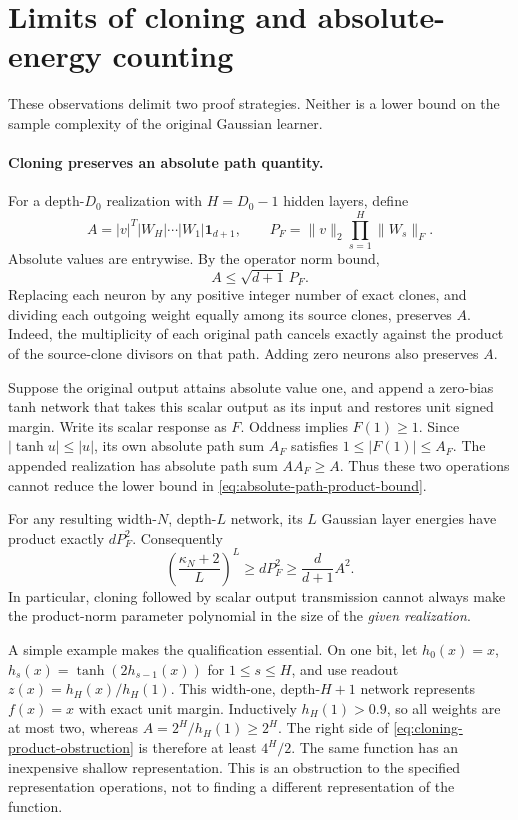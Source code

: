 \section{Limits of cloning and absolute-energy counting}
\label{sec:representation-limits}

These observations delimit two proof strategies. Neither is a lower bound
on the sample complexity of the original Gaussian learner.

\paragraph{Cloning preserves an absolute path quantity.}
For a depth-$D_0$ realization with $H=D_0-1$ hidden layers, define
\[
 A=|v|^T|W_H|\cdots|W_1|\mathbf1_{d+1},\qquad
 P_F=\|v\|_2\prod_{s=1}^H\|W_s\|_F.
\]
Absolute values are entrywise. By the operator norm bound,
\begin{equation}\label{eq:absolute-path-product-bound}
 A\le\sqrt{d+1}\,P_F.
\end{equation}
Replacing each neuron by any positive integer number of exact clones,
and dividing each outgoing weight equally among its source clones,
preserves $A$. Indeed, the multiplicity of each original path cancels
exactly against the product of the source-clone divisors on that path.
Adding zero neurons also preserves $A$.

Suppose the original output attains absolute value one, and append a
zero-bias tanh network that takes this scalar output as its input and
restores unit signed margin. Write its scalar response as $F$. Oddness
implies $F(1)\ge1$. Since $|\tanh u|\le|u|$, its own absolute path sum
$A_F$ satisfies $1\le|F(1)|\le A_F$. The appended realization has
absolute path sum $AA_F\ge A$. Thus these two operations cannot reduce
the lower bound in \eqref{eq:absolute-path-product-bound}.

For any resulting width-$N$, depth-$L$ network, its $L$ Gaussian layer
energies have product exactly $dP_F^2$. Consequently
\begin{equation}\label{eq:cloning-product-obstruction}
 \left(\frac{\kappa_N+2}{L}\right)^L
 \ge dP_F^2\ge\frac{d}{d+1}A^2.
\end{equation}
In particular, cloning followed by scalar output transmission cannot
always make the product-norm parameter polynomial in the size of the
\emph{given realization}.

A simple example makes the qualification essential. On one bit, let
$h_0(x)=x$, $h_s(x)=\tanh(2h_{s-1}(x))$ for $1\le s\le H$, and use
readout $z(x)=h_H(x)/h_H(1)$. This width-one, depth-$H+1$ network
represents $f(x)=x$ with exact unit margin. Inductively $h_H(1)>0.9$,
so all weights are at most two, whereas $A=2^H/h_H(1)\ge2^H$.
The right side of \eqref{eq:cloning-product-obstruction} is therefore
at least $4^H/2$. The same function has an inexpensive shallow
representation. This is an obstruction to the specified representation
operations, not to finding a different representation of the function.

